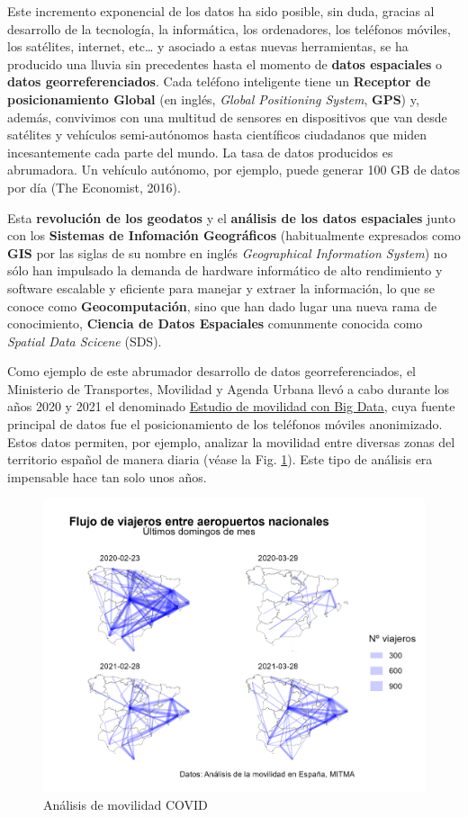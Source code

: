 \documentclass[
]{book}
\begin{document}
Este incremento exponencial de los datos ha sido posible, sin duda, gracias al
desarrollo de la tecnología, la informática, los ordenadores, los teléfonos
móviles, los satélites, internet, etc\ldots{} y asociado a estas nuevas herramientas,
se ha producido una lluvia sin precedentes hasta el momento de \textbf{datos
espaciales} o \textbf{datos georreferenciados}. Cada teléfono inteligente tiene un
\textbf{Receptor de posicionamiento Global} (en inglés, \emph{Global Positioning System},
\textbf{GPS}) y, además, convivimos con una multitud de sensores en dispositivos que
van desde satélites y vehículos semi-autónomos hasta científicos ciudadanos que
miden incesantemente cada parte del mundo. La tasa de datos producidos es
abrumadora. Un vehículo autónomo, por ejemplo, puede generar 100 GB de datos por
día (The Economist, 2016).

Esta \textbf{revolución de los geodatos} y el \textbf{análisis de los datos espaciales}
junto con los \textbf{Sistemas de Infomación Geográficos} (habitualmente expresados
como \textbf{GIS} por las siglas de su nombre en inglés \emph{Geographical Information
System}) no sólo han impulsado la demanda de hardware informático de alto
rendimiento y software escalable y eficiente para manejar y extraer la
información, lo que se conoce como \textbf{Geocomputación}, sino que han dado lugar
una nueva rama de conocimiento, \textbf{Ciencia de Datos Espaciales} comunmente
conocida como \emph{Spatial Data Scicene} (SDS).

Como ejemplo de este abrumador desarrollo de datos georreferenciados, el
Ministerio de Transportes, Movilidad y Agenda Urbana llevó a cabo durante los
años 2020 y 2021 el denominado \href{https://www.mitma.gob.es/ministerio/covid-19/evolucion-movilidad-big-data}{Estudio de movilidad con Big
Data},
cuya fuente principal de datos fue el posicionamiento de los teléfonos móviles
anonimizado. Estos datos permiten, por ejemplo, analizar la movilidad entre
diversas zonas del territorio español de manera diaria (véase la Fig.
\ref{fig:mov}). Este tipo de análisis era impensable hace tan solo unos años.

\begin{figure}

{\centering \includegraphics[width=0.6\linewidth]{img/movilidad_covid} 

}

\caption{Análisis de movilidad COVID}\label{fig:mov}
\end{figure}
\end{document}
